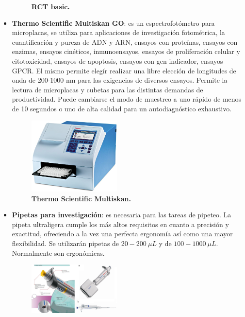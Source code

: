 \begin{itemize}
\begin{figure}
        \caption{\textbf{RCT basic.}}
        \label{basic}
        \end{figure}
     \item \textbf{\textcolor{morado}{Thermo Scientific Multiskan GO}}: es un espectrofotómetro para microplacas, se utiliza para aplicaciones de investigación fotométrica, la cuantificación y pureza de ADN y ARN, ensayos con proteínas, ensayos con enzimas, ensayos cinéticos, inmunoensayos, ensayos de proliferación celular y citotoxicidad, ensayos de apoptosis, ensayos con gen indicador, ensayos GPCR.
     El mismo permite elegír realizar una libre elección de longitudes de onda de 200-1000 nm para las exigencias de diversos ensayos. Permite la lectura de microplacas y cubetas para las distintas demandas de productividad. Puede cambiarse el modo de muestreo a uno rápido de menos de 10 segundos o uno de alta calidad para un autodiagnóstico exhaustivo. %
        \begin{figure}
            \includegraphics[width=0.44\textwidth]{Tarea1/espectro.png}
        \caption{\textbf{Thermo Scientific Multiskan.}}
        \label{espectro}
        \end{figure}
     \item \textbf{\textcolor{morado}{Pipetas para investigación}}: es necesaria para las tareas de pipeteo. La pipeta ultraligera cumple los más altos requisitos en cuanto a precisión y exactitud, ofreciendo a la vez una perfecta ergonomía así como una mayor flexibilidad. Se utilizarán pipetas de $20 - 200 ~\mu L$ y de $100 - 1000 ~\mu L$. Normalmente son ergonómicas. %
        \begin{figure}
            \includegraphics[width=0.44\textwidth]{Tarea1/pipeta.png}

\end{figure}
\end{itemize}

